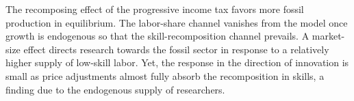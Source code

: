 The recomposing effect of the progressive income tax favors more fossil production in equilibrium. 
 The labor-share channel vanishes from the model once growth is endogenous so that the skill-recomposition channel prevails. A market-size effect directs research towards the fossil sector in response to a relatively higher supply of low-skill labor. Yet,  the response in the direction of innovation is small as price adjustments almost fully absorb the recomposition in skills, a finding due to the endogenous supply of researchers.


 




